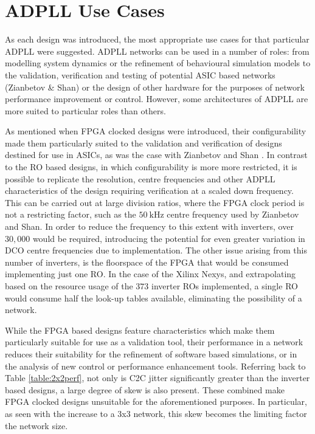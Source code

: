 \section*{\acs{ADPLL} Use Cases}
As each design was introduced, the most appropriate use cases for that particular \ac{ADPLL} were suggested. \ac{ADPLL} networks can be used in a number of roles: from modelling system dynamics or the refinement of behavioural simulation models to the validation, verification and testing of potential \ac{ASIC} based networks (Zianbetov \& Shan) or the design of other hardware for the purposes of network performance improvement or control. However, some architectures of \ac{ADPLL} are more suited to particular roles than others.

As mentioned when \ac{FPGA} clocked designs were introduced, their configurability made them particularly suited to the validation and verification of designs destined for use in \acp{ASIC}, as was the case with Zianbetov and Shan \cite{zianbetov2013phd,shan2014phd}. In contrast to the \ac{RO} based designs, in which configurability is more more restricted, it is possible to replicate the resolution, centre frequencies and other \ac{ADPLL} characteristics of the design requiring verification at a scaled down frequency. This can be carried out at large division ratios, where the \ac{FPGA} clock period is not a restricting factor, such as the $50~\si{\kilo\hertz}$ centre frequency used by Zianbetov and Shan. In order to reduce the frequency to this extent with inverters, over $30,000$ would be required, introducing the potential for even greater variation in \ac{DCO} centre frequencies due to implementation. The other issue arising from this number of inverters, is the floorspace of the \ac{FPGA} that would be consumed implementing just one \ac{RO}. In the case of the Xilinx \acl{Nexys}, and extrapolating based on the resource usage of the $373$ inverter \acp{RO} implemented, a single \ac{RO} would consume half the look-up tables available, eliminating the possibility of a network.

While the \ac{FPGA} based designs feature characteristics which make them particularly suitable for use as a validation tool, their performance in a network reduces their suitability for the refinement of software based simulations, or in the analysis of new control or performance enhancement tools. Referring back to Table \ref{table:2x2perf}, not only is \ac{C2C} jitter significantly greater than the inverter based designs, a large degree of skew is also present. These combined make \ac{FPGA} clocked designs unsuitable for the aforementioned purposes. In particular, as seen with the increase to a 3x3 network, this skew becomes the limiting factor the network size.

